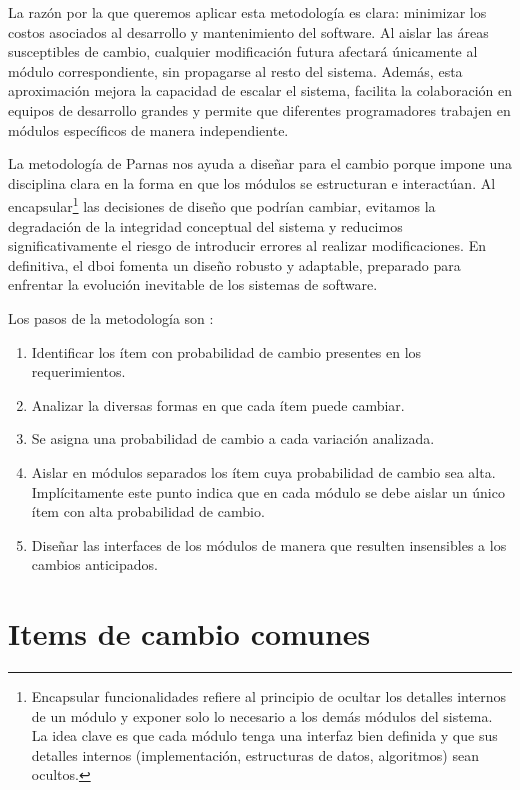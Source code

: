 La razón por la que queremos aplicar esta metodología es clara: minimizar los costos asociados al desarrollo y mantenimiento del software. Al aislar las áreas susceptibles de cambio, cualquier modificación futura afectará únicamente al módulo correspondiente, sin propagarse al resto del sistema. Además, esta aproximación mejora la capacidad de escalar el sistema, facilita la colaboración en equipos de desarrollo grandes y permite que diferentes programadores trabajen en módulos específicos de manera independiente.

La metodología de Parnas nos ayuda a diseñar para el cambio porque impone una disciplina clara en la forma en que los módulos se estructuran e interactúan. Al encapsular\footnote{Encapsular funcionalidades refiere al principio de ocultar los detalles internos de un módulo y exponer solo lo necesario a los demás módulos del sistema. La idea clave es que cada módulo tenga una interfaz bien definida y que sus detalles internos (implementación, estructuras de datos, algoritmos) sean ocultos.} las decisiones de diseño que podrían cambiar, evitamos la degradación de la integridad conceptual del sistema y reducimos significativamente el riesgo de introducir errores al realizar modificaciones. En definitiva, el \gls{dboi} fomenta un diseño robusto y adaptable, preparado para enfrentar la evolución inevitable de los sistemas de software.


Los pasos de la metodología son \cite{Parnas02, cristia2022diseno}:

\begin{enumerate}
	\item Identificar los ítem con probabilidad de cambio presentes en los requerimientos.
	\item Analizar la diversas formas en que cada ítem puede cambiar.
	\item Se asigna una probabilidad de cambio a cada variación analizada.
	\item Aislar en módulos separados los ítem cuya probabilidad de cambio sea alta. Implícitamente este punto indica que en cada módulo se debe aislar un único ítem con alta probabilidad de cambio.
	\item Diseñar las interfaces de los módulos de manera que resulten insensibles a los cambios anticipados.

\end{enumerate}



\section{Items de cambio comunes}
\label{listaItems}

